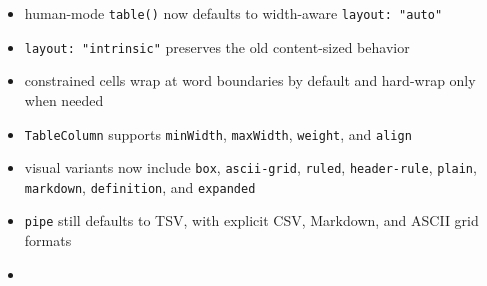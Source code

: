 \begin{itemize}
\tightlist
\item
  human-mode \texttt{t\allowbreak{}a\allowbreak{}b\allowbreak{}l\allowbreak{}e\allowbreak{}(\allowbreak{})} now defaults to width-aware \texttt{l\allowbreak{}a\allowbreak{}y\allowbreak{}o\allowbreak{}u\allowbreak{}t\allowbreak{}:\allowbreak{} \allowbreak{}"\allowbreak{}a\allowbreak{}u\allowbreak{}t\allowbreak{}o\allowbreak{}"}
\item
  \texttt{l\allowbreak{}a\allowbreak{}y\allowbreak{}o\allowbreak{}u\allowbreak{}t\allowbreak{}:\allowbreak{} \allowbreak{}"\allowbreak{}i\allowbreak{}n\allowbreak{}t\allowbreak{}r\allowbreak{}i\allowbreak{}n\allowbreak{}s\allowbreak{}i\allowbreak{}c\allowbreak{}"} preserves the old content-sized behavior
\item
  constrained cells wrap at word boundaries by default and hard-wrap only when needed
\item
  \texttt{T\allowbreak{}a\allowbreak{}b\allowbreak{}l\allowbreak{}e\allowbreak{}C\allowbreak{}o\allowbreak{}l\allowbreak{}u\allowbreak{}m\allowbreak{}n} supports \texttt{m\allowbreak{}i\allowbreak{}n\allowbreak{}W\allowbreak{}i\allowbreak{}d\allowbreak{}t\allowbreak{}h}, \texttt{m\allowbreak{}a\allowbreak{}x\allowbreak{}W\allowbreak{}i\allowbreak{}d\allowbreak{}t\allowbreak{}h}, \texttt{w\allowbreak{}e\allowbreak{}i\allowbreak{}g\allowbreak{}h\allowbreak{}t}, and \texttt{a\allowbreak{}l\allowbreak{}i\allowbreak{}g\allowbreak{}n}
\item
  visual variants now include \texttt{b\allowbreak{}o\allowbreak{}x}, \texttt{a\allowbreak{}s\allowbreak{}c\allowbreak{}i\allowbreak{}i\allowbreak{}-\allowbreak{}g\allowbreak{}r\allowbreak{}i\allowbreak{}d}, \texttt{r\allowbreak{}u\allowbreak{}l\allowbreak{}e\allowbreak{}d}, \texttt{h\allowbreak{}e\allowbreak{}a\allowbreak{}d\allowbreak{}e\allowbreak{}r\allowbreak{}-\allowbreak{}r\allowbreak{}u\allowbreak{}l\allowbreak{}e}, \texttt{p\allowbreak{}l\allowbreak{}a\allowbreak{}i\allowbreak{}n}, \texttt{m\allowbreak{}a\allowbreak{}r\allowbreak{}k\allowbreak{}d\allowbreak{}o\allowbreak{}w\allowbreak{}n}, \texttt{d\allowbreak{}e\allowbreak{}f\allowbreak{}i\allowbreak{}n\allowbreak{}i\allowbreak{}t\allowbreak{}i\allowbreak{}o\allowbreak{}n}, and \texttt{e\allowbreak{}x\allowbreak{}p\allowbreak{}a\allowbreak{}n\allowbreak{}d\allowbreak{}e\allowbreak{}d}
\item
  \texttt{p\allowbreak{}i\allowbreak{}p\allowbreak{}e} still defaults to TSV, with explicit CSV, Markdown, and ASCII grid formats
\item

\end{itemize}
